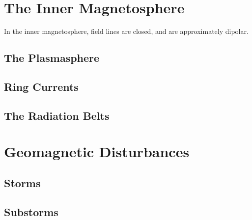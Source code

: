 \section{The Inner Magnetosphere}

In the inner magnetosphere, field lines are closed, and are approximately dipolar. 

\subsection{The Plasmasphere}

\subsection{Ring Currents}

\subsection{The Radiation Belts}

\section{Geomagnetic Disturbances}

\subsection{Storms}

\subsection{Substorms}






